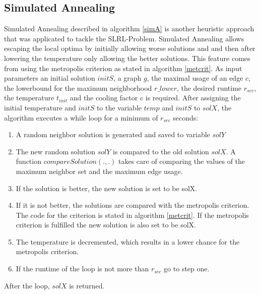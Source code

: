 \documentclass [12pt]{article}
\begin{document}
\subsection{Simulated Annealing}
Simulated Annealing described in algorithm \ref{simA} is another heuristic approach that was applicated to tackle the SLRL-Problem. Simulated Annealing allows 
escaping the local optima by initially allowing worse solutions and and then after lowering the temperature only allowing the better solutions.
This feature comes from using the metropolis criterion as stated in algorithm \ref{metcrit}.
As input parameters an initial solution $initS$, a graph $g$, the maximal usage of an edge $c$, the lowerbound for the maximum neighborhood $r\_lower$,
the desired runtime $r_{sec}$, the temperature $t_{init}$ and the cooling factor c is required.
After assigning the initial temperature and $initS$ to the variable $temp$ and $initS$ to $solX$,
the algorithm executes a while loop for a minimum of $r_{sec}$ seconds:
\begin{enumerate}
  \item {A random neighbor solution is generated and saved to variable $solY$}
  \item {The new random solution $solY$ is compared to the old solution $solX$. A function $compareSolution(.,.)$ takes care of 
        comparing the values of the maximum neighbor set and the maximum edge usage.}
  \item {If the solution is better, the new solution is set to be solX.}
  \item {If it is not better, the solutions are compared with the metropolis criterion. The code for the criterion is stated in algorithm \ref{metcrit}. If the metropolis criterion
        is fulfilled the new solution is also set to be solX. }
  \item {The temperature is decremented, which results in a lower chance for the metropolis criterion.}
  \item {If the runtime of the loop is not more than $r_{sec}$ go to step one.}
\end{enumerate}
After the loop, $solX$ is returned.
\end{document}
